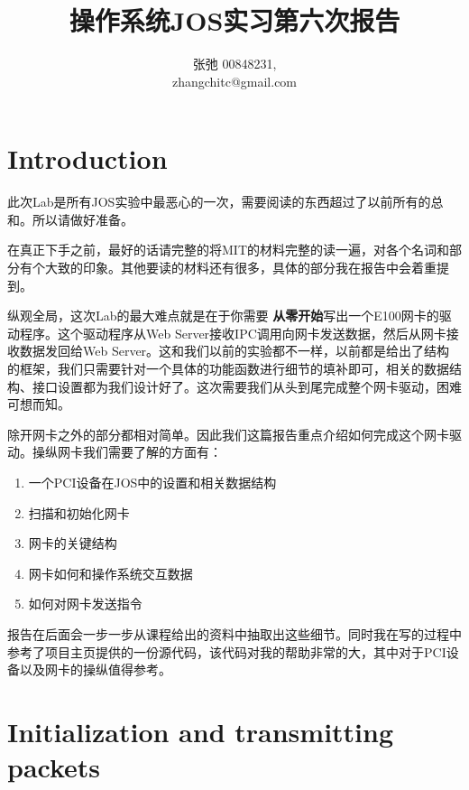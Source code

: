 \documentclass{article}
\newcommand{\highlight}[1]{{\bfseries \color{red}  #1}}
\begin{document}
\begin{CJK*}{UTF8}{gkai}

\title{操作系统JOS实习第六次报告}
\author{张弛 \hspace{1ex} 00848231, \\
        zhangchitc@gmail.com}

\maketitle
\tableofcontents
\newpage

\section{Introduction}

此次Lab是所有JOS实验中最恶心的一次，需要阅读的东西超过了以前所有的总和。所以请做好准备。

在真正下手之前，最好的话请完整的将MIT的材料完整的读一遍，对各个名词和部分有个大致的印象。其他要读的材料还有很多，具体的部分我在报告中会着重提到。


纵观全局，这次Lab的最大难点就是在于你需要\highlight{从零开始}写出一个E100网卡的驱动程序。这个驱动程序从Web Server接收IPC调用向网卡发送数据，然后从网卡接收数据发回给Web Server。这和我们以前的实验都不一样，以前都是给出了结构的框架，我们只需要针对一个具体的功能函数进行细节的填补即可，相关的数据结构、接口设置都为我们设计好了。这次需要我们从头到尾完成整个网卡驱动，困难可想而知。

除开网卡之外的部分都相对简单。因此我们这篇报告重点介绍如何完成这个网卡驱动。操纵网卡我们需要了解的方面有：

\begin{enumerate}
\item{一个PCI设备在JOS中的设置和相关数据结构}
\item{扫描和初始化网卡}
\item{网卡的关键结构}
\item{网卡如何和操作系统交互数据}
\item{如何对网卡发送指令}
\end{enumerate}

报告在后面会一步一步从课程给出的资料中抽取出这些细节。同时我在写的过程中参考了项目主页提供的一份源代码，该代码对我的帮助非常的大，其中对于PCI设备以及网卡的操纵值得参考。


\section{Initialization and transmitting packets}


\end{CJK*}
\end{document}
